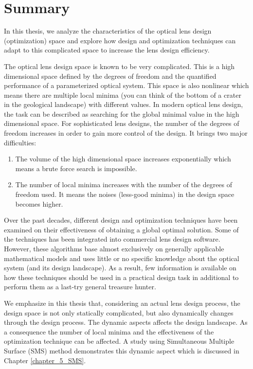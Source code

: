 \chapter*{Summary}

In this thesis, we analyze the characteristics of the optical lens design (optimization) space and explore how design and optimization techniques can adapt to this complicated space to increase the lens design efficiency. 

The optical lens design space is known to be very complicated. This is a high dimensional space defined by the degrees of freedom and the quantified performance of a parameterized optical system. This space is also nonlinear which means there are multiple local minima (you can think of the bottom of a crater in the geological landscape) with different values. In modern optical lens design, the task can be described as searching for the global minimal value in the high dimensional space. For sophisticated lens designs, the number of the degrees of freedom increases in order to gain more control of the design. It brings two major difficulties:  
\begin{enumerate}[nosep]
\item The volume of the high dimensional space increases exponentially which means a brute force search is impossible. 
\item The number of local minima increases with the number of the degrees of freedom used. It means the noises (less-good minima) in the design space becomes higher. 
\end{enumerate}

Over the past decades, different design and optimization techniques have been examined on their effectiveness of obtaining a global optimal solution. Some of the techniques has been integrated into commercial lens design software. However, these algorithms base almost exclusively on generally applicable mathematical models and uses little or no specific knowledge about the optical system (and its design landscape). As a result, few information is available on how these techniques should be used in a practical design task in additional to perform them as a last-try general treasure hunter. 

We emphasize in this thesis that, considering an actual lens design process, the design space is not only statically complicated, but also dynamically changes through the design process. The dynamic aspects affects the design landscape. As a consequence the number of local minima and the effectiveness of the optimization technique can be affected. A study using Simultaneous Multiple Surface (SMS) method demonstrates this dynamic aspect which is discussed in Chapter \ref{chapter_5_SMS}.

